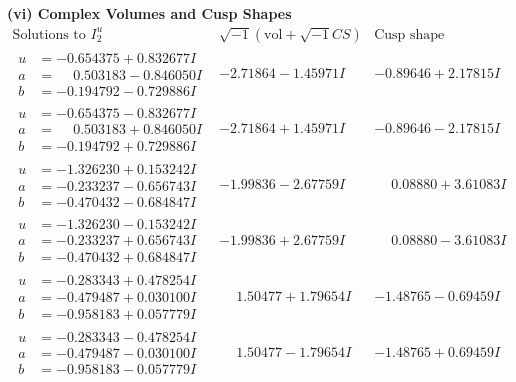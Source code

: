 \documentclass[1p]{elsarticle_modified}
\theoremstyle{definition}
\newcommand{\I}{\sqrt{-1}}
\begin{document}
\newpage\flushleft \textbf{(vi) Complex Volumes and Cusp Shapes}
$$\begin{array}{c|c|c}  
\text{Solutions to }I^u_{2}& \I (\text{vol} + \sqrt{-1}CS) & \text{Cusp shape}\\
 \hline 
\begin{aligned}
u &= -0.654375 + 0.832677 I \\
a &= \phantom{-}0.503183 - 0.846050 I \\
b &= -0.194792 - 0.729886 I\end{aligned}
 & -2.71864 - 1.45971 I & -0.89646 + 2.17815 I \\ \hline\begin{aligned}
u &= -0.654375 - 0.832677 I \\
a &= \phantom{-}0.503183 + 0.846050 I \\
b &= -0.194792 + 0.729886 I\end{aligned}
 & -2.71864 + 1.45971 I & -0.89646 - 2.17815 I \\ \hline\begin{aligned}
u &= -1.326230 + 0.153242 I \\
a &= -0.233237 - 0.656743 I \\
b &= -0.470432 - 0.684847 I\end{aligned}
 & -1.99836 - 2.67759 I & \phantom{-}0.08880 + 3.61083 I \\ \hline\begin{aligned}
u &= -1.326230 - 0.153242 I \\
a &= -0.233237 + 0.656743 I \\
b &= -0.470432 + 0.684847 I\end{aligned}
 & -1.99836 + 2.67759 I & \phantom{-}0.08880 - 3.61083 I \\ \hline\begin{aligned}
u &= -0.283343 + 0.478254 I \\
a &= -0.479487 + 0.030100 I \\
b &= -0.958183 + 0.057779 I\end{aligned}
 & \phantom{-}1.50477 + 1.79654 I & -1.48765 - 0.69459 I \\ \hline\begin{aligned}
u &= -0.283343 - 0.478254 I \\
a &= -0.479487 - 0.030100 I \\
b &= -0.958183 - 0.057779 I\end{aligned}
 & \phantom{-}1.50477 - 1.79654 I & -1.48765 + 0.69459 I \\ \hline\begin{aligned}

\end{aligned}
\end{array}$$
\end{document}
